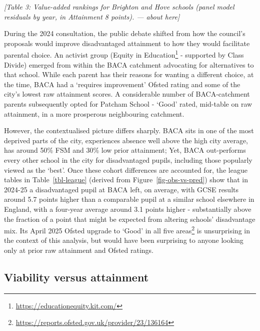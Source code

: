 \documentclass[
  12pt,
  titlepage]{article}
\begin{document}
\emph{{[}Table 3: Value-added rankings for Brighton and Hove schools
(panel model residuals by year, in Attainment 8 points). --- about
here{]}}

During the 2024 consultation, the public debate shifted from how the
council's proposals would improve disadvantaged attainment to how they
would facilitate parental choice. An activist group (Equity in
Education\footnote{\url{https://educationequity.kit.com/}} - supported
by Class Divide) emerged from within the BACA catchment advocating for
alternatives to that school. While each parent has their reasons for
wanting a different choice, at the time, BACA had a `requires
improvement' Ofsted rating and some of the city's lowest raw attainment
scores. A considerable number of BACA-catchment parents subsequently
opted for Patcham School - `Good' rated, mid-table on raw attainment, in
a more prosperous neighbouring catchment.

However, the contextualised picture differs sharply. BACA sits in one of
the most deprived parts of the city, experiences absence well above the
high city average, has around 50\% FSM and 30\% low prior attainment;
Yet, BACA out-performs every other school in the city for disadvantaged
pupils, including those popularly viewed as the `best'. Once these
cohort differences are accounted for, the league tables in
Table~\ref{tbl-league} (derived from Figure~\ref{fig-obs-vs-pred}) show
that in 2024-25 a disadvantaged pupil at BACA left, on average, with
GCSE results around 5.7 points higher than a comparable pupil at a
similar school elsewhere in England, with a four-year average around 3.1
points higher - substantially above the fraction of a point that might
be expected from altering schools' disadvantage mix. Its April 2025
Ofsted upgrade to `Good' in all five areas\footnote{\url{https://reports.ofsted.gov.uk/provider/23/136164}}
is unsurprising in the context of this analysis, but would have been
surprising to anyone looking only at prior raw attainment and Ofsted
ratings.

\subsection{Viability versus
attainment}\label{viability-versus-attainment}
\end{document}
